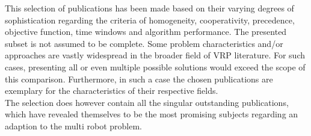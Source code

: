 This selection of publications has been made based on their varying degrees of sophistication regarding the criteria of homogeneity, cooperativity, precedence, objective function, time windows and algorithm performance. The presented subset is not assumed to be complete. Some problem characteristics and/or approaches are vastly widespread in the broader field of VRP literature. For such cases, presenting all or even multiple possible solutions would exceed the scope of this comparison. Furthermore, in such a case the chosen publications are exemplary for the characteristics of their respective fields.\\
The selection does however contain all the singular outstanding publications, which have revealed themselves to be the most promising subjects regarding an adaption to the multi robot problem.\\

